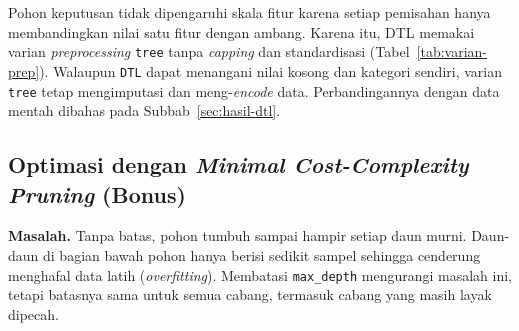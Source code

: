 Pohon keputusan tidak dipengaruhi skala fitur karena setiap pemisahan hanya
membandingkan nilai satu fitur dengan ambang. Karena itu, DTL memakai varian
\textit{preprocessing} \texttt{tree} tanpa \textit{capping} dan standardisasi
(Tabel~\ref{tab:varian-prep}). Walaupun \texttt{DTL} dapat menangani nilai kosong
dan kategori sendiri, varian \texttt{tree} tetap mengimputasi dan meng-\textit{encode}
data. Perbandingannya dengan data mentah dibahas pada Subbab~\ref{sec:hasil-dtl}.









\subsection{Optimasi dengan \textit{Minimal Cost-Complexity Pruning} (Bonus)}
\label{sec:ccp}

\textbf{Masalah.} Tanpa batas, pohon tumbuh sampai hampir setiap daun murni.
Daun-daun di bagian bawah pohon hanya berisi sedikit sampel sehingga cenderung
menghafal data latih (\textit{overfitting}). Membatasi \texttt{max\_depth} mengurangi masalah ini,
tetapi batasnya sama untuk semua cabang, termasuk cabang yang masih layak
dipecah.

